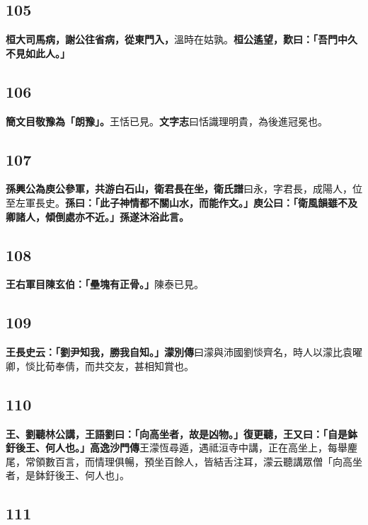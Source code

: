 \subsection*{105}

\textbf{桓大司馬病，謝公往省病，從東門入，}{\footnotesize 溫時在姑孰。}\textbf{桓公遙望，歎曰：「吾門中久不見如此人。」}

\subsection*{106}

\textbf{簡文目敬豫為「朗豫」。}{\footnotesize 王恬已見。\textbf{文字志}曰恬識理明貴，為後進冠冕也。}

\subsection*{107}

\textbf{孫興公為庾公參軍，共游白石山，衛君長在坐，}{\footnotesize \textbf{衛氏譜}曰永，字君長，成陽人，位至左軍長史。}\textbf{孫曰：「此子神情都不關山水，而能作文。」庾公曰：「衛風韻雖不及卿諸人，傾倒處亦不近。」孫遂沐浴此言。}

\subsection*{108}

\textbf{王右軍目陳玄伯：「壘塊有正骨。」}{\footnotesize 陳泰已見。}

\subsection*{109}

\textbf{王長史云：「劉尹知我，勝我自知。」}{\footnotesize \textbf{濛別傳}曰濛與沛國劉惔齊名，時人以濛比袁曜卿，惔比荀奉倩，而共交友，甚相知賞也。}

\subsection*{110}

\textbf{王、劉聽林公講，王語劉曰：「向高坐者，故是凶物。」復更聽，王又曰：「自是鉢釪後王、何人也。」}{\footnotesize \textbf{高逸沙門傳}王濛恆尋遁，遇祗洹寺中講，正在高坐上，每舉麈尾，常領數百言，而情理俱暢，預坐百餘人，皆結舌注耳，濛云聽講眾僧「向高坐者，是鉢釪後王、何人也」。}

\subsection*{111}

